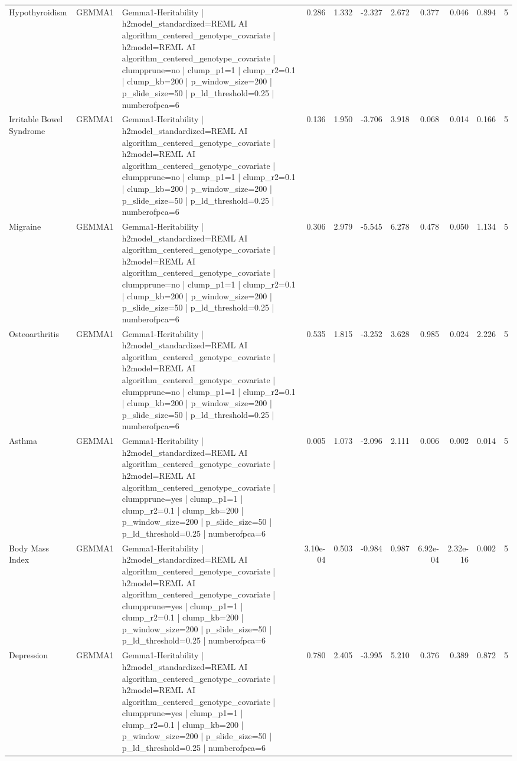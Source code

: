 \begin{landscape}
\begin{longtable}{p{2.4cm}p{1.8cm}p{6.0cm}rrrrrrrr}
Hypothyroidism & GEMMA1 & Gemma1-Heritability | h2model\_standardized=REML AI algorithm\_centered\_genotype\_covariate | h2model=REML AI algorithm\_centered\_genotype\_covariate | clumpprune=no | clump\_p1=1 | clump\_r2=0.1 | clump\_kb=200 | p\_window\_size=200 | p\_slide\_size=50 | p\_ld\_threshold=0.25 | numberofpca=6 & 0.286 & 1.332 & -2.327 & 2.672 & 0.377 & 0.046 & 0.894 & 5 \\
Irritable Bowel Syndrome & GEMMA1 & Gemma1-Heritability | h2model\_standardized=REML AI algorithm\_centered\_genotype\_covariate | h2model=REML AI algorithm\_centered\_genotype\_covariate | clumpprune=no | clump\_p1=1 | clump\_r2=0.1 | clump\_kb=200 | p\_window\_size=200 | p\_slide\_size=50 | p\_ld\_threshold=0.25 | numberofpca=6 & 0.136 & 1.950 & -3.706 & 3.918 & 0.068 & 0.014 & 0.166 & 5 \\
Migraine & GEMMA1 & Gemma1-Heritability | h2model\_standardized=REML AI algorithm\_centered\_genotype\_covariate | h2model=REML AI algorithm\_centered\_genotype\_covariate | clumpprune=no | clump\_p1=1 | clump\_r2=0.1 | clump\_kb=200 | p\_window\_size=200 | p\_slide\_size=50 | p\_ld\_threshold=0.25 | numberofpca=6 & 0.306 & 2.979 & -5.545 & 6.278 & 0.478 & 0.050 & 1.134 & 5 \\
Osteoarthritis & GEMMA1 & Gemma1-Heritability | h2model\_standardized=REML AI algorithm\_centered\_genotype\_covariate | h2model=REML AI algorithm\_centered\_genotype\_covariate | clumpprune=no | clump\_p1=1 | clump\_r2=0.1 | clump\_kb=200 | p\_window\_size=200 | p\_slide\_size=50 | p\_ld\_threshold=0.25 | numberofpca=6 & 0.535 & 1.815 & -3.252 & 3.628 & 0.985 & 0.024 & 2.226 & 5 \\
Asthma & GEMMA1 & Gemma1-Heritability | h2model\_standardized=REML AI algorithm\_centered\_genotype\_covariate | h2model=REML AI algorithm\_centered\_genotype\_covariate | clumpprune=yes | clump\_p1=1 | clump\_r2=0.1 | clump\_kb=200 | p\_window\_size=200 | p\_slide\_size=50 | p\_ld\_threshold=0.25 | numberofpca=6 & 0.005 & 1.073 & -2.096 & 2.111 & 0.006 & 0.002 & 0.014 & 5 \\
Body Mass Index & GEMMA1 & Gemma1-Heritability | h2model\_standardized=REML AI algorithm\_centered\_genotype\_covariate | h2model=REML AI algorithm\_centered\_genotype\_covariate | clumpprune=yes | clump\_p1=1 | clump\_r2=0.1 | clump\_kb=200 | p\_window\_size=200 | p\_slide\_size=50 | p\_ld\_threshold=0.25 | numberofpca=6 & 3.10e-04 & 0.503 & -0.984 & 0.987 & 6.92e-04 & 2.32e-16 & 0.002 & 5 \\
Depression & GEMMA1 & Gemma1-Heritability | h2model\_standardized=REML AI algorithm\_centered\_genotype\_covariate | h2model=REML AI algorithm\_centered\_genotype\_covariate | clumpprune=yes | clump\_p1=1 | clump\_r2=0.1 | clump\_kb=200 | p\_window\_size=200 | p\_slide\_size=50 | p\_ld\_threshold=0.25 | numberofpca=6 & 0.780 & 2.405 & -3.995 & 5.210 & 0.376 & 0.389 & 0.872 & 5 \\

\end{longtable}
\end{landscape}

